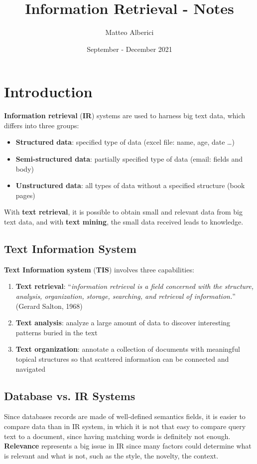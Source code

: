 \documentclass{article}
\title{Information Retrieval - Notes}
\author{Matteo Alberici}
\date{September - December 2021}
\begin{document}
\maketitle

\newpage

\tableofcontents

\newpage

\section{Introduction}
\textbf{Information retrieval} (\textbf{IR}) systems are used to harness big text data, which differs into three groups:
\begin{itemize}
    \item \textbf{Structured data}: specified type of data (excel file: name, age, date …)
    \item \textbf{Semi-structured data}: partially specified type of data (email: fields and body)
    \item \textbf{Unstructured data}: all types of data without a specified structure (book pages) \\
\end{itemize}
With \textbf{text retrieval}, it is possible to obtain small and relevant data from big text data, and with \textbf{text mining}, the small data received leads to knowledge.
\subsection{Text Information System}
\textbf{Text Information system} (\textbf{TIS}) involves three capabilities:
\begin{enumerate}
    \item \textbf{Text retrieval}: “\textit{information retrieval is a field concerned with the structure, analysis, organization, storage, searching, and retrieval of information.}” (Gerard Salton, 1968)
    \item \textbf{Text analysis}: analyze a large amount of data to discover interesting patterns buried in the text
    \item \textbf{Text organization}: annotate a collection of documents with meaningful topical structures so that scattered information can be connected and navigated \\
\end{enumerate}
\subsection{Database vs. IR Systems}
Since databases records are made of well-defined semantics fields, it is easier to compare data than in IR system, in which it is not that easy to compare query text to a document, since having matching words is definitely not enough. 
\textbf{Relevance} represents a big issue in IR since many factors could determine what is relevant and what is not, such as the style, the novelty, the context. \\
\end{document}
